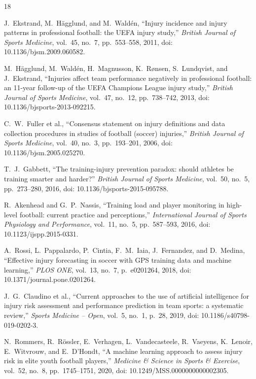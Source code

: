 \documentclass[conference]{IEEEtran}
\begin{document}
\begin{thebibliography}{18}

J.~Ekstrand, M.~H\"{a}gglund, and M.~Wald\'{e}n, ``Injury incidence and injury patterns in professional football: the UEFA injury study,'' \emph{British Journal of Sports Medicine}, vol.~45, no.~7, pp.~553--558, 2011, doi: 10.1136/bjsm.2009.060582.

M.~H\"{a}gglund, M.~Wald\'{e}n, H.~Magnusson, K.~R{\o}nsen, S.~Lundqvist, and J.~Ekstrand, ``Injuries affect team performance negatively in professional football: an 11-year follow-up of the UEFA Champions League injury study,'' \emph{British Journal of Sports Medicine}, vol.~47, no.~12, pp.~738--742, 2013, doi: 10.1136/bjsports-2013-092215.

C.~W.~Fuller et al., ``Consensus statement on injury definitions and data collection procedures in studies of football (soccer) injuries,'' \emph{British Journal of Sports Medicine}, vol.~40, no.~3, pp.~193--201, 2006, doi: 10.1136/bjsm.2005.025270.

T.~J.~Gabbett, ``The training-injury prevention paradox: should athletes be training smarter and harder?'' \emph{British Journal of Sports Medicine}, vol.~50, no.~5, pp.~273--280, 2016, doi: 10.1136/bjsports-2015-095788.

R.~Akenhead and G.~P.~Nassis, ``Training load and player monitoring in high-level football: current practice and perceptions,'' \emph{International Journal of Sports Physiology and Performance}, vol.~11, no.~5, pp.~587--593, 2016, doi: 10.1123/ijspp.2015-0331.

A.~Rossi, L.~Pappalardo, P.~Cintia, F.~M.~Iaia, J.~Fernandez, and D.~Medina, ``Effective injury forecasting in soccer with GPS training data and machine learning,'' \emph{PLOS ONE}, vol.~13, no.~7, p.~e0201264, 2018, doi: 10.1371/journal.pone.0201264.

J.~G.~Claudino et al., ``Current approaches to the use of artificial intelligence for injury risk assessment and performance prediction in team sports: a systematic review,'' \emph{Sports Medicine -- Open}, vol.~5, no.~1, p.~28, 2019, doi: 10.1186/s40798-019-0202-3.

N.~Rommers, R.~R\"{o}ssler, E.~Verhagen, L.~Vandecasteele, R.~Vaeyens, K.~Lenoir, E.~Witvrouw, and E.~D'Hondt, ``A machine learning approach to assess injury risk in elite youth football players,'' \emph{Medicine \& Science in Sports \& Exercise}, vol.~52, no.~8, pp.~1745--1751, 2020, doi: 10.1249/MSS.0000000000002305.


\end{thebibliography}
\end{document}

